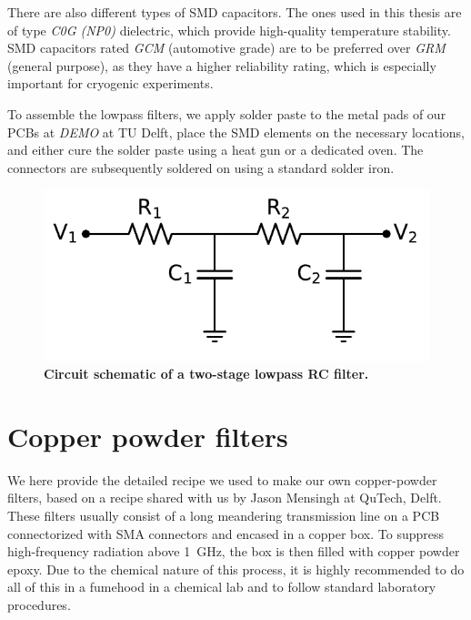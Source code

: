 There are also different types of SMD capacitors.
%
The ones used in this thesis are of type \textit{C0G (NP0)} dielectric, which provide high-quality temperature stability.
%
SMD capacitors rated \textit{GCM} (automotive grade) are to be preferred over \textit{GRM} (general purpose), as they have a higher reliability rating, which is especially important for cryogenic experiments.

To assemble the lowpass filters, we apply solder paste to the metal pads of our PCBs at \textit{DEMO} at TU Delft, place the SMD elements on the necessary locations, and either cure the solder paste using a heat gun or a dedicated oven.
%
The connectors are subsequently soldered on using a standard solder iron.

\begin{figure}
	\centering
	\includegraphics[width=.5\linewidth]{appendix/figs/RC_twostage}
	\caption{
		\textbf{Circuit schematic of a two-stage lowpass RC filter.}
	}
	\label{fig:rctwostage}
\end{figure}

\section{Copper powder filters}\label{app:copperpowder}

We here provide the detailed recipe we used to make our own copper-powder filters, based on a recipe shared with us by Jason Mensingh at QuTech, Delft.
%
These filters usually consist of a long meandering transmission line on a PCB connectorized with SMA connectors and encased in a copper box.
%
To suppress high-frequency radiation above \SI{1}{\giga\hertz}, the box is then filled with copper powder epoxy.
%
Due to the chemical nature of this process, it is highly recommended to do all of this in a fumehood in a chemical lab and to follow standard laboratory procedures.

